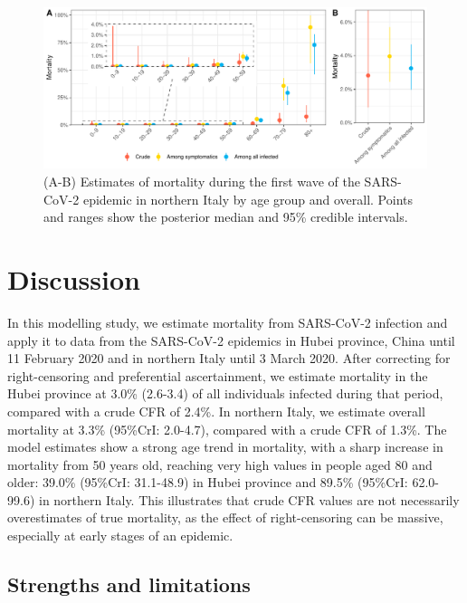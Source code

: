 \documentclass{article}
\begin{document}
\begin{figure}[h]
	\includegraphics[width=\linewidth]{../format_output/figures/cfr_italy.pdf}
	\caption{(A-B) Estimates of mortality during the first wave of the SARS-CoV-2 epidemic in northern Italy by age group and overall. Points and ranges show the posterior median and 95\% credible intervals.}
	\label{fig:mortalityit}
\end{figure}



\section*{Discussion}


In this modelling study, we estimate mortality from SARS-CoV-2 infection and apply it to data from the SARS-CoV-2 epidemics in Hubei province, China until 11 February 2020 and in northern Italy until 3 March 2020.
After correcting for right-censoring and preferential ascertainment, we estimate mortality in the Hubei province at 3.0\% (2.6-3.4) of all individuals infected during that period, compared with a crude CFR of 2.4\%.
In northern Italy, we estimate overall mortality at 3.3\% (95\%CrI: 2.0-4.7), compared with a crude CFR of 1.3\%.
The model estimates show a strong age trend in mortality, with a sharp increase in mortality from 50 years old, reaching very high values in people aged 80 and older: 39.0\% (95\%CrI: 31.1-48.9) in Hubei province and 89.5\% (95\%CrI: 62.0-99.6) in northern Italy.
This illustrates that crude CFR values are not necessarily overestimates of true mortality, as the effect of right-censoring can be massive, especially at early stages of an epidemic.

\subsection*{Strengths and limitations}
\end{document}

